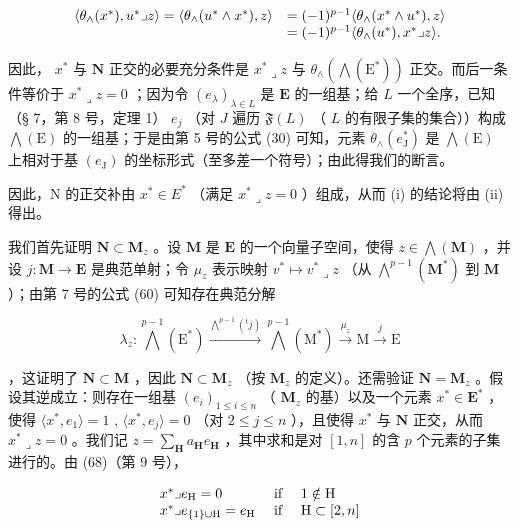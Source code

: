 \[
\begin{array}{r l} \langle \theta_ {\wedge} (x ^ {*}), u ^ {*} \lrcorner z \rangle = \langle \theta_ {\wedge} (u ^ {*} \wedge x ^ {*}), z \rangle & = (- 1) ^ {p - 1} \langle \theta_ {\wedge} (x ^ {*} \wedge u ^ {*}), z \rangle \\ & = (- 1) ^ {p - 1} \langle \theta_ {\wedge} (u ^ {*}), x ^ {*} \lrcorner z \rangle . \end{array}
\]

因此， \(x^*\) 与 \(\mathbf{N}\) 正交的必要充分条件是 \(x^* \lrcorner z\) 与 \(\theta_\wedge (\bigwedge (\mathrm{E}^*))\) 正交。而后一条件等价于 \(x^* \lrcorner z = 0\) ；因为令 \((e_\lambda)_{\lambda \in L}\) 是 \(\mathbf{E}\) 的一组基；给 \(L\) 一个全序，已知（§ 7，第 8 号，定理 1） \(e_j\) （对 \(J\) 遍历 \(\mathfrak{F}(L)\) （ \(L\) 的有限子集的集合））构成 \(\bigwedge (\mathrm{E})\) 的一组基；于是由第 5 号的公式 (30) 可知，元素 \(\theta_{\wedge}(e_{\mathrm{J}}^{*})\) 是 \(\bigwedge(\mathrm{E})\) 上相对于基 \((e_{\mathrm{J}})\) 的坐标形式（至多差一个符号）；由此得我们的断言。

因此，N 的正交补由 \(x^{*} \in E^{*}\) （满足 \(x^{*} \lrcorner z = 0\) ）组成，从而 (i) 的结论将由 (ii) 得出。

我们首先证明 \(\mathbf{N} \subset \mathbf{M}_z\) 。设 \(\mathbf{M}\) 是 \(\mathbf{E}\) 的一个向量子空间，使得 \(z \in \bigwedge (\mathbf{M})\) ，并设 \(j: \mathbf{M} \to \mathbf{E}\) 是典范单射；令 \(\mu_z\) 表示映射 \(v^* \mapsto v^* \lrcorner z\) （从 \(\bigwedge^{p-1}(\mathbf{M}^*)\) 到 \(\mathbf{M}\) ）；由第 7 号的公式 (60) 可知存在典范分解

\[
\lambda_ {z}: \bigwedge^ {p - 1} (\mathrm{E} ^ {*}) \xrightarrow {\bigwedge^ {p - 1} ({} ^ {t} j)} \bigwedge^ {p - 1} (\mathrm{M} ^ {*}) \xrightarrow {\mu_ {z}} \mathrm{M} \xrightarrow {j} \mathrm{E}
\]

，这证明了 \(\mathbf{N} \subset \mathbf{M}\) ，因此 \(\mathbf{N} \subset \mathbf{M}_z\) （按 \(\mathbf{M}_z\) 的定义）。还需验证 \(\mathbf{N} = \mathbf{M}_z\) 。假设其逆成立：则存在一组基 \((e_i)_{1 \leqslant i \leqslant n}\) （ \(\mathbf{M}_z\) 的基）以及一个元素 \(x^* \in \mathbf{E}^*\) ，使得 \(\langle x^*, e_1 \rangle = 1\) , \(\langle x^*, e_j \rangle = 0\) （对 \(2 \leqslant j \leqslant n\) ），且使得 \(x^*\) 与 \(\mathbf{N}\) 正交，从而 \(x^* \lrcorner z = 0\) 。我们记 \(z = \sum_{\mathbf{H}} a_{\mathbf{H}} e_{\mathbf{H}}\) ，其中求和是对 \([1, n]\) 的含 \(p\) 个元素的子集进行的。由 (68)（第 9 号），

\[
\begin{array}{l l} x ^ {*} \lrcorner e _ {\mathrm{H}} = 0 & \text { if } \quad 1 \notin \mathrm{H} \\ x ^ {*} \lrcorner e _ {\{1 \} \cup \mathrm{H}} = e _ {\mathrm{H}} & \text { if } \quad \mathrm{H} \subset [ 2, n ] \end{array}
\]

